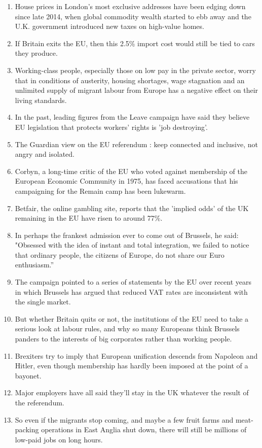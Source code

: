 \documentclass[fleqn,moreauthors,10pt]{ds_report}
\begin{document}
\begin{enumerate}
    \item House prices in London's most exclusive addresses have been edging down since late 2014, when global commodity wealth started to ebb away and the U.K. government introduced new taxes on high-value homes.
    \item If Britain exits the EU, then this 2.5\% import cost would still be tied to cars they produce.
    \item Working-class people, especially those on low pay in the private sector, worry that in conditions of austerity, housing shortages, wage stagnation and an unlimited supply of migrant labour from Europe has a negative effect on their living standards.
    \item In the past, leading figures from the Leave campaign have said they believe EU legislation that protects workers' rights is 'job destroying'.
    \item The Guardian view on the EU referendum : keep connected and inclusive, not angry and isolated.
    \item Corbyn, a long-time critic of the EU who voted against membership of the European Economic Community in 1975, has faced accusations that his campaigning for the Remain camp has been lukewarm.
    \item Betfair, the online gambling site, reports that the 'implied odds' of the UK remaining in the EU have risen to around 77\%.
    \item In perhaps the frankest admission ever to come out of Brussels, he said: "Obsessed with the idea of instant and total integration, we failed to notice that ordinary people, the citizens of Europe, do not share our Euro enthusiasm.”
    \item The campaign pointed to a series of statements by the EU over recent years in which Brussels has argued that reduced VAT rates are inconsistent with the single market.
    \item But whether Britain quits or not, the institutions of the EU need to take a serious look at labour rules, and why so many Europeans think Brussels panders to the interests of big corporates rather than working people.
    \item Brexiters try to imply that European unification descends from Napoleon and Hitler, even though membership has hardly been imposed at the point of a bayonet.
    \item Major employers have all said they'll stay in the UK whatever the result of the referendum.
    \item So even if the migrants stop coming, and maybe a few fruit farms and meat-packing operations in East Anglia shut down, there will still be millions of low-paid jobs on long hours.

\end{enumerate}
\end{document}
